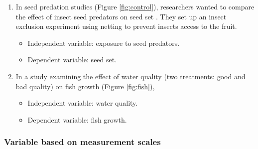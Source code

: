 \documentclass[
]{book}
\providecommand{\tightlist}{%
  \setlength{\itemsep}{0pt}\setlength{\parskip}{0pt}}
\begin{document}
\begin{enumerate}
\def\labelenumi{\arabic{enumi}.}
\tightlist
\item
  In seed predation studies (Figure \ref{fig:control}), researchers wanted to compare the effect of insect seed predators on seed set \citep{tiansawat2017}. They set up an insect exclusion experiment using netting to prevent insects access to the fruit.

  \begin{itemize}
  \tightlist
  \item
    Independent variable: exposure to seed predators.
  \item
    Dependent variable: seed set.
  \end{itemize}
\item
  In a study examining the effect of water quality (two treatments: good and bad quality) on fish growth (Figure \ref{fig:fish}),

  \begin{itemize}
  \tightlist
  \item
    Independent variable: water quality.
  \item
    Dependent variable: fish growth.
  \end{itemize}
\end{enumerate}

\subsubsection{Variable based on measurement scales}\label{variable-based-on-measurement-scales}

\citep{abs2025}
\end{document}

